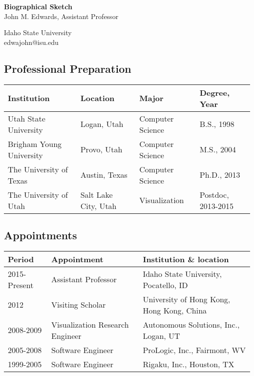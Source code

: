\documentclass[svgnames,12pt]{article}
\begin{document}
\begin{center}
\begin{large}\textbf{Biographical Sketch} \\
John M. Edwards, Assistant Professor \\ \end{large}
Idaho State University \\
edwajohn@isu.edu \\
\end{center}

\subsection*{Professional Preparation}
\begin{tabular}{llll}
Institution & Location & Major & Degree, Year \\
\midrule
Utah State University & Logan, Utah & Computer Science & B.S., 1998 \\
Brigham Young University & Provo, Utah & Computer Science & M.S., 2004 \\
The University of Texas & Austin, Texas & Computer Science & Ph.D., 2013 \\
The University of Utah & Salt Lake City, Utah & Visualization & Postdoc, 2013-2015
\end{tabular}

\subsection*{Appointments}
\begin{tabular}{lll}
Period & Appointment & Institution \& location \\
\midrule
2015-Present & Assistant Professor & Idaho State University, Pocatello, ID \\
2012 & Visiting Scholar & University of Hong Kong, Hong Kong, China \\
2008-2009 & Visualization Research Engineer & Autonomous Solutions, Inc., Logan, UT \\
2005-2008 & Software Engineer & ProLogic, Inc., Fairmont, WV \\
1999-2005 & Software Engineer & Rigaku, Inc., Houston, TX
\end{tabular}
\end{document}
